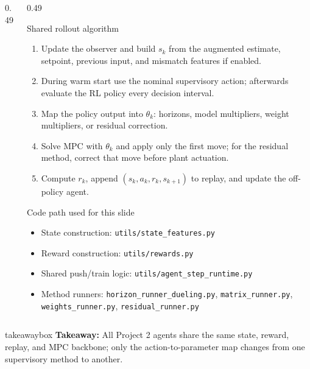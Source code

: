 \documentclass[aspectratio=169]{beamer}
\newcommand{\takeawaybox}[1]{%
\vspace{0.01cm}
\begin{center}
\begin{beamercolorbox}[wd=0.94\textwidth,sep=3pt,center,rounded=true,shadow=false]{takeawaybox}
\scriptsize
\textbf{\textcolor{maroon1}{Takeaway:}} #1
\end{beamercolorbox}
\end{center}
}
\begin{document}
\begin{frame}
\begin{columns}[T,onlytextwidth]
\begin{column}{0.49\textwidth}
\end{column}

\begin{column}{0.49\textwidth}

\begin{block}{Shared rollout algorithm}
\begin{enumerate}\justifying
  \setlength{\itemsep}{0.25ex}
  \item Update the observer and build \(s_k\) from the augmented estimate, setpoint, previous input, and mismatch features if enabled.
  \item During warm start use the nominal supervisory action; afterwards evaluate the RL policy every decision interval.
  \item Map the policy output into \(\theta_k\): horizons, model multipliers, weight multipliers, or residual correction.
  \item Solve MPC with \(\theta_k\) and apply only the first move; for the residual method, correct that move before plant actuation.
  \item Compute \(r_k\), append \((s_k,a_k,r_k,s_{k+1})\) to replay, and update the off-policy agent.
\end{enumerate}
\end{block}

\vspace{0.02cm}

\begin{block}{Code path used for this slide}
\begin{itemize}\justifying
  \setlength{\itemsep}{0.25ex}
  \item State construction: \texttt{utils/state\_features.py}
  \item Reward construction: \texttt{utils/rewards.py}
  \item Shared push/train logic: \texttt{utils/agent\_step\_runtime.py}
  \item Method runners: \texttt{horizon\_runner\_dueling.py}, \texttt{matrix\_runner.py}, \texttt{weights\_runner.py}, \texttt{residual\_runner.py}
\end{itemize}
\end{block}

\end{column}

\end{columns}

\takeawaybox{All Project 2 agents share the same state, reward, replay, and MPC backbone; only the action-to-parameter map changes from one supervisory method to another.}

\end{frame}
\end{document}
